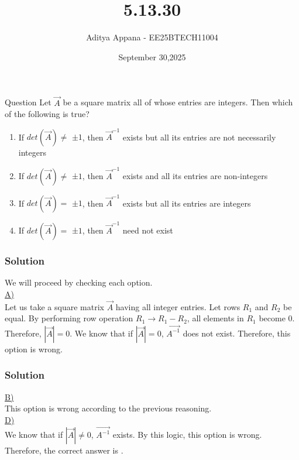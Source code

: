 \documentclass{beamer}
\title %
{5.13.30}
\date{September 30,2025}
\author %
{Aditya Appana - EE25BTECH11004}
\begin{document}
\frame{\titlepage}
\begin{frame}{Question}
Let $\vec{A}$ be a square matrix all of whose entries are integers. Then which of the
following is true?
\begin{enumerate}
    \item If $det(\vec{A})\neq $ ±$1$, then $\vec{A}^{-1}$ exists but all its entries are not necessarily integers
    \item If $det(\vec{A})\neq $ ±$1$, then $\vec{A}^{-1}$ exists and all its entries are non-integers
    \item If $det(\vec{A}) = $ ±$1$, then $\vec{A}^{-1}$ exists but all its entries are integers
    \item If $det(\vec{A})= $ ±$1$, then $\vec{A}^{-1}$ need not exist

\end{enumerate}
\end{frame}



\begin{frame}[fragile]
    \frametitle{Solution}
We will proceed by checking each option.\\

\underline{A)}\\

Let us take a square matrix $\vec{A}$ having all integer entries. Let rows $R_1$ and $R_2$ be equal.
By performing row operation $R_1 \xrightarrow{} R_1 - R_2$, all elements in $R_1 $ become 0. Therefore, $|\vec{A}| = 0$. We know that if $|\vec{A}|= 0$, $\vec{A^{-1}}$ does not exist. Therefore, this option is wrong.\\

\end{frame}


\begin{frame}[fragile]
    \frametitle{Solution}
\underline{B)}\\

This option is wrong according to the previous reasoning.\\

\underline{D)}\\

We know that if $|\vec{A}| \neq 0$, $\vec{A^{-1}}$ exists. By this logic, this option is wrong.\\

Therefore, the correct answer is .
\end{frame}
\end{document}
